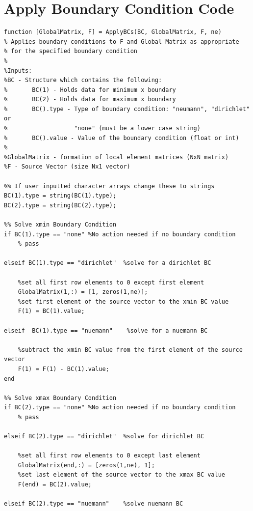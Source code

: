 \documentclass[11pt]{article}
\begin{document}
\begin{appendices}
\begin{lstlisting}
\end{lstlisting}
\pagebreak



\section{Apply Boundary Condition Code} \label{ap:BC}
\begin{lstlisting}
function [GlobalMatrix, F] = ApplyBCs(BC, GlobalMatrix, F, ne)
% Applies boundary conditions to F and Global Matrix as appropriate
% for the specified boundary condition
%
%Inputs:
%BC - Structure which contains the following:
%       BC(1) - Holds data for minimum x boundary
%       BC(2) - Holds data for maximum x boundary
%       BC().type - Type of boundary condition: "neumann", "dirichlet" or
%                   "none" (must be a lower case string)
%       BC().value - Value of the boundary condition (float or int)
%
%GlobalMatrix - formation of local element matrices (NxN matrix)
%F - Source Vector (size Nx1 vector)

%% If user inputted character arrays change these to strings
BC(1).type = string(BC(1).type);
BC(2).type = string(BC(2).type);

%% Solve xmin Boundary Condition 
if BC(1).type == "none" %No action needed if no boundary condition
    % pass 
    
elseif BC(1).type == "dirichlet"  %solve for a dirichlet BC
    
    %set all first row elements to 0 except first element  
    GlobalMatrix(1,:) = [1, zeros(1,ne)];   
    %set first element of the source vector to the xmin BC value
    F(1) = BC(1).value;
    
elseif  BC(1).type == "nuemann"    %solve for a nuemann BC
    
    %subtract the xmin BC value from the first element of the source vector 
    F(1) = F(1) - BC(1).value;
end

%% Solve xmax Boundary Condition
if BC(2).type == "none" %No action needed if no boundary condition
    % pass
    
elseif BC(2).type == "dirichlet"  %solve for dirichlet BC
    
    %set all first row elements to 0 except last element 
    GlobalMatrix(end,:) = [zeros(1,ne), 1];
    %set last element of the source vector to the xmax BC value
    F(end) = BC(2).value;
    
elseif BC(2).type == "nuemann"    %solve nuemann BC
    

\end{lstlisting}
\end{appendices}
\end{document}
